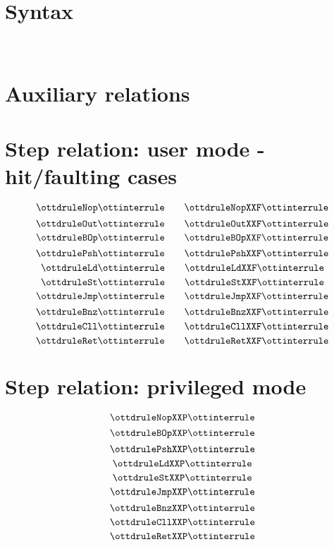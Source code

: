 \documentclass{article}
\begin{document}
\section*{Syntax}

\ottmetavars\\[3ex]

\ottgrammartabular{
\ottn\ottinterrule
\ottL\ottinterrule
\otta\ottinterrule
\ottinstr\ottinterrule
\ottS\ottinterrule
}

\section*{Auxiliary relations}

\ottgrammartabular{
\ottformula\ottinterrule
}

\section*{Step relation: user mode - hit/faulting cases}

\begin{small}
\[ \ottdruleNop \ottinterrule 
   \quad \quad \ottdruleNopXXF \ottinterrule \]
\[ \ottdruleOut \ottinterrule
   \quad \quad  \ottdruleOutXXF \ottinterrule \]
\[ \ottdruleBOp \ottinterrule
   \quad \quad \ottdruleBOpXXF \ottinterrule \]
\[ \ottdrulePsh \ottinterrule 
   \quad \quad \ottdrulePshXXF \ottinterrule \]
 \[ \ottdruleLd \ottinterrule 
   \quad \quad \ottdruleLdXXF \ottinterrule \]
\[ \ottdruleSt \ottinterrule
   \quad \quad \ottdruleStXXF \ottinterrule \]
\[ \ottdruleJmp \ottinterrule
   \quad \quad \ottdruleJmpXXF \ottinterrule \]
\[ \ottdruleBnz \ottinterrule 
   \quad \quad  \ottdruleBnzXXF \ottinterrule  \] 
\[ \ottdruleCll \ottinterrule
   \quad \quad  \ottdruleCllXXF \ottinterrule \]
\[ \ottdruleRet \ottinterrule   
   \quad \quad  \ottdruleRetXXF \ottinterrule \]
\end{small}

\section{Step relation: privileged mode}

\[ \ottdruleNopXXP \ottinterrule \]
\[ \ottdruleBOpXXP \ottinterrule \]
\[ \ottdrulePshXXP \ottinterrule \]
\[ \ottdruleLdXXP \ottinterrule \]
\[ \ottdruleStXXP \ottinterrule \]
\[ \ottdruleJmpXXP \ottinterrule \]
\[ \ottdruleBnzXXP \ottinterrule \] 
\[ \ottdruleCllXXP \ottinterrule \]
\[ \ottdruleRetXXP \ottinterrule \] 


\end{document}
